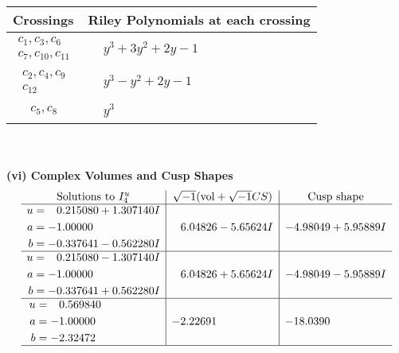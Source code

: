 \documentclass[1p]{elsarticle_modified}
\theoremstyle{definition}
\newcommand{\I}{\sqrt{-1}}
\begin{document}
\begin{tabular}{m{50pt}|m{274pt}}
Crossings & \hspace{64pt}Riley Polynomials at each crossing \\
\hline $$\begin{aligned}c_{1},c_{3},c_{6}\\c_{7},c_{10},c_{11}\end{aligned}$$&$\begin{aligned}
&y^3+3 y^2+2 y-1
\end{aligned}$\\
\hline $$\begin{aligned}c_{2},c_{4},c_{9}\\c_{12}\end{aligned}$$&$\begin{aligned}
&y^3- y^2+2 y-1
\end{aligned}$\\
\hline $$\begin{aligned}c_{5},c_{8}\end{aligned}$$&$\begin{aligned}
&y^3
\end{aligned}$\\
\hline
\end{tabular}\\~\\
\newpage\flushleft \textbf{(vi) Complex Volumes and Cusp Shapes}
$$\begin{array}{c|c|c}  
\text{Solutions to }I^u_{4}& \I (\text{vol} + \sqrt{-1}CS) & \text{Cusp shape}\\
 \hline 
\begin{aligned}
u &= \phantom{-}0.215080 + 1.307140 I \\
a &= -1.00000\phantom{ +0.000000I} \\
b &= -0.337641 - 0.562280 I\end{aligned}
 & \phantom{-}6.04826 - 5.65624 I & -4.98049 + 5.95889 I \\ \hline\begin{aligned}
u &= \phantom{-}0.215080 - 1.307140 I \\
a &= -1.00000\phantom{ +0.000000I} \\
b &= -0.337641 + 0.562280 I\end{aligned}
 & \phantom{-}6.04826 + 5.65624 I & -4.98049 - 5.95889 I \\ \hline\begin{aligned}
u &= \phantom{-}0.569840\phantom{ +0.000000I} \\
a &= -1.00000\phantom{ +0.000000I} \\
b &= -2.32472\phantom{ +0.000000I}\end{aligned}
 & -2.22691\phantom{ +0.000000I} & -18.0390\phantom{ +0.000000I}\\
 \hline 
 \end{array}$$\newpage\newpage\renewcommand{\arraystretch}{1}
\end{document}
